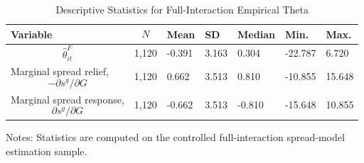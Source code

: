 \begin{table}[H]\centering
\begin{threeparttable}
\caption{Descriptive Statistics for Full-Interaction Empirical Theta}
\label{tab:theta_descriptive_stats}
\scriptsize
\begin{tabularx}{\textwidth}{lYYYYYY}
\toprule
Variable & $$N$$ & Mean & SD & Median & Min. & Max. \\
\midrule
$$\widehat{\theta}^{F}_{it}$$ & 1,120 & -0.391 & 3.163 & 0.304 & -22.787 & 6.720 \\
Marginal spread relief, $$-\partial s^g/\partial G$$ & 1,120 & 0.662 & 3.513 & 0.810 & -10.855 & 15.648 \\
Marginal spread response, $$\partial s^g/\partial G$$ & 1,120 & -0.662 & 3.513 & -0.810 & -15.648 & 10.855 \\
\bottomrule
\end{tabularx}
\begin{tablenotes}[flushleft]\footnotesize
\item Notes: Statistics are computed on the controlled full-interaction spread-model estimation sample.
\end{tablenotes}
\end{threeparttable}
\end{table}
